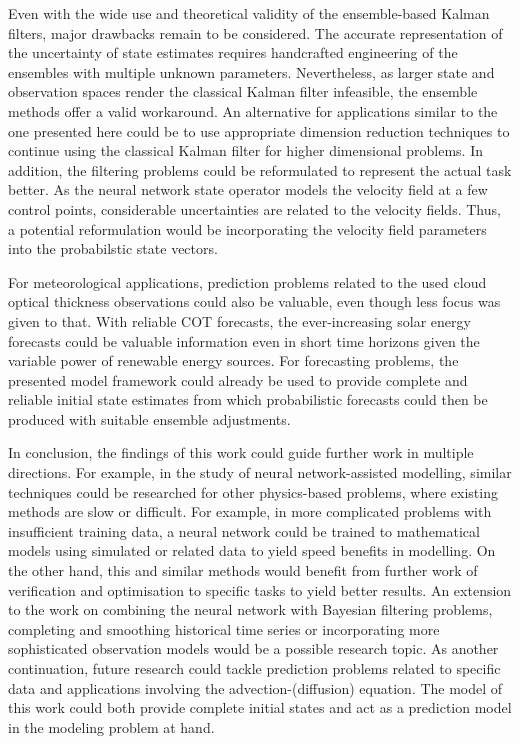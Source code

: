 Even with the wide use and theoretical validity of the ensemble-based Kalman filters, major drawbacks remain to be considered.
The accurate representation of the uncertainty of state estimates requires handcrafted engineering of the ensembles with multiple unknown parameters.
Nevertheless, as larger state and observation spaces render the classical Kalman filter infeasible, the ensemble methods offer a valid workaround.
An alternative for applications similar to the one presented here could be to use appropriate dimension reduction techniques to continue using the classical Kalman filter for higher dimensional problems.
In addition, the filtering problems could be reformulated to represent the actual task better. 
As the neural network state operator models the velocity field at a few control points, considerable uncertainties are related to the velocity fields.
Thus, a potential reformulation would be incorporating the velocity field parameters into the probabilstic state vectors.

For meteorological applications, prediction problems related to the used cloud optical thickness observations could also be valuable, even though less focus was given to that.
With reliable COT forecasts, the ever-increasing solar energy forecasts could be valuable information even in short time horizons given the variable power of renewable energy sources.
For forecasting problems, the presented model framework could already be used to provide complete and reliable initial state estimates from which probabilistic forecasts could then be produced with suitable ensemble adjustments.

In conclusion, the findings of this work could guide further work in multiple directions.
For example, in the study of neural network-assisted modelling, similar techniques could be researched for other physics-based problems, where existing methods are slow or difficult.
For example, in more complicated problems with insufficient training data, a neural network could be trained to mathematical models using simulated or related data to yield speed benefits in modelling.
On the other hand, this and similar methods would benefit from further work of verification and optimisation to specific tasks to yield better results.
An extension to the work on combining the neural network with Bayesian filtering problems, completing and smoothing historical time series or incorporating more sophisticated observation models would be a possible research topic.
As another continuation, future research could tackle prediction problems related to specific data and applications involving the advection-(diffusion) equation.
The model of this work could both provide complete initial states and act as a prediction model in the modeling problem at hand.
